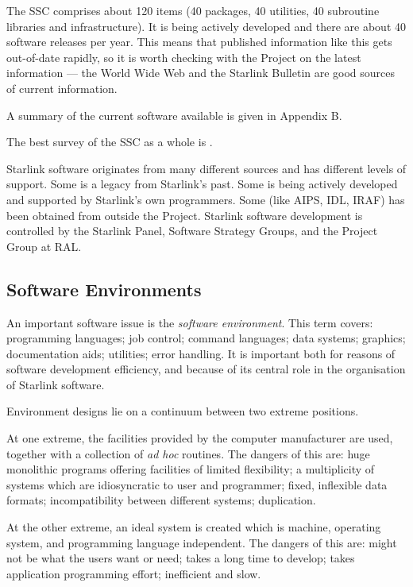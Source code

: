 {The SSC comprises about 120 items (40 packages, 40 utilities, 40 subroutine
libraries and infrastructure).
It is being actively developed and there are about 40 software releases per
year.
This means that published information like this gets out-of-date rapidly,
so it is worth checking with the Project on the latest information --- the
World Wide Web and the Starlink Bulletin are good sources of current
information.
\begin{latexonly}
A summary of the current software available is given in Appendix B.
\end{latexonly}
The best survey of the SSC as a whole is .

Starlink software originates from many different sources and has different
levels of support.
Some is a legacy from Starlink's past.
Some is being actively developed and supported by Starlink's own programmers.
Some (like AIPS, IDL, IRAF) has been obtained from outside the Project.
Starlink software development is controlled by the Starlink Panel,
Software Strategy Groups, and the Project Group at RAL.

\newpage

\subsection*{Software Environments}

An important software issue is the {\em software environment}\/.
This term covers:
programming languages;
job control;
command languages;
data systems;
graphics;
documentation aids;
utilities;
error handling.
It is important both for reasons of software development efficiency, and
because of its central role in the organisation of Starlink software.

Environment designs lie on a continuum between two extreme positions.

At one extreme, the facilities provided by the computer manufacturer are used,
together with a collection of {\em ad hoc}\/ routines.
The dangers of this are:
huge monolithic programs offering facilities of limited flexibility;
a multiplicity of systems which are idiosyncratic to user and programmer;
fixed, inflexible data formats;
incompatibility between different systems;
duplication.

At the other extreme, an ideal system is created which is machine, operating
system, and programming language independent.
The dangers of this are:
might not be what the users want or need;
takes a long time to develop;
takes application programming effort;
inefficient and slow.

}
